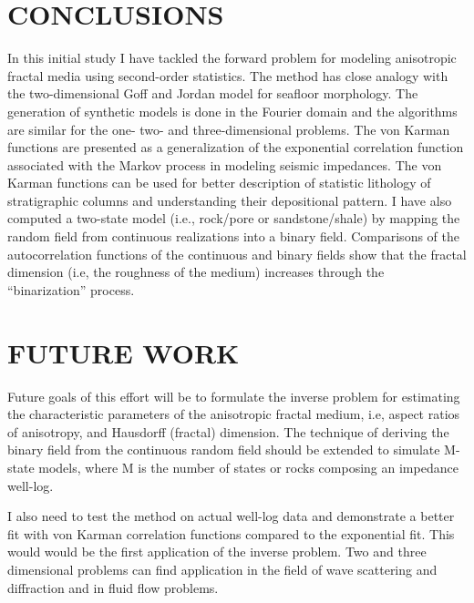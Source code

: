%

\section{CONCLUSIONS}

  In this initial study I have tackled the forward problem for modeling anisotropic
fractal media using second-order statistics. The method has close analogy with
the two-dimensional Goff and Jordan model for seafloor morphology. The 
generation of synthetic models is done in the Fourier domain and the
algorithms are similar for the one- two- and three-dimensional problems. 
The von Karman
functions are presented as a generalization of the exponential correlation function 
associated with the Markov process in modeling seismic impedances. The
von Karman functions can be used for better description of statistic lithology
of stratigraphic columns and understanding their depositional pattern. 
I have also computed a two-state model (i.e., rock/pore or sandstone/shale)
by mapping the random field from continuous realizations into a binary field.
Comparisons of the autocorrelation functions of the continuous and binary
fields show that the fractal dimension (i.e, the roughness of the medium) 
increases through the ``binarization'' process.

\section{ FUTURE WORK}

Future goals of this effort will be to formulate the inverse problem
for estimating the characteristic parameters of the anisotropic fractal medium,
i.e, aspect ratios of anisotropy, and Hausdorff (fractal) dimension.
The technique of deriving the binary field from the continuous random field
should be extended to simulate M-state models, where M is the number of
states or rocks composing an impedance well-log.\
\par
I also need to test the method on actual well-log data and demonstrate a better
fit with von Karman correlation functions compared to the exponential fit.
This would would be the first application of the inverse problem. Two and three dimensional problems can find
application in the field of wave scattering and diffraction and in fluid
flow problems.

